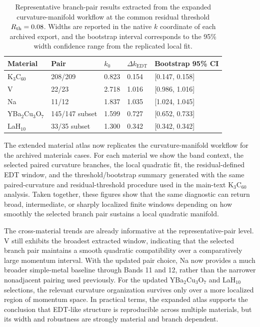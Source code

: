 \documentclass[12pt]{article}
\begin{document}
\begin{table}[p]
\centering
\small
\caption{Representative branch-pair results extracted from the expanded
curvature-manifold workflow at the
common residual threshold $R_{\rm th}=0.08$. Widths are reported in the native
$k$ coordinate of each archived export, and the bootstrap interval corresponds
to the 95\% width confidence range from the replicated local fit.}
\begin{tabular}{lllll}
\hline
Material & Pair & $k_0$ & $\Delta k_{\mathrm{EDT}}$ & Bootstrap 95\% CI \\
\hline
K$_3$C$_{60}$ & 208/209 & 0.823 & 0.154 & [0.147, 0.158] \\
V & 22/23 & 2.718 & 1.016 & [0.986, 1.016] \\
Na & 11/12 & 1.837 & 1.035 & [1.024, 1.045] \\
YBa$_2$Cu$_3$O$_7$ & 145/147 subset & 1.599 & 0.727 & [0.652, 0.733] \\
LaH$_{10}$ & 33/35 subset & 1.300 & 0.342 & [0.342, 0.342] \\
\hline
\end{tabular}
\label{tab:s4_material_controls}
\end{table}

The extended material atlas now replicates the curvature-manifold
workflow for the archived materials cases. For each material we show the band
context, the selected paired curvature branches, the local quadratic fit, the
residual-defined EDT window, and the threshold/bootstrap summary generated with
the same paired-curvature and residual-threshold procedure used in the main-text
K$_3$C$_{60}$ analysis. Taken together, these figures show that the same
diagnostic can return broad, intermediate, or sharply localized finite windows
depending on how smoothly the selected branch pair sustains a local quadratic
manifold.

The cross-material trends are already informative at the representative-pair
level. V still exhibits the broadest extracted window, indicating that the
selected branch pair maintains a smooth quadratic compatibility over a
comparatively large momentum interval. With the updated pair choice, Na now
provides a much broader simple-metal baseline through Bands 11 and 12, rather
than the narrower nonadjacent pairing used previously. For the updated
YBa$_2$Cu$_3$O$_7$ and LaH$_{10}$ selections, the relevant curvature
organization survives only over a more localized region of momentum space. In
practical terms, the expanded atlas supports the conclusion that EDT-like
structure is reproducible across multiple materials, but its width and
robustness are strongly material and branch dependent.
\end{document}
